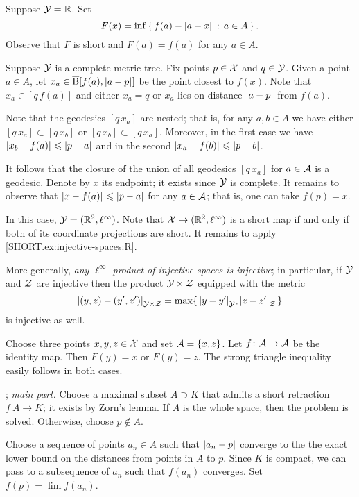 Suppose $\mathcal{Y}=\mathbb{R}$.
Set 
\[F(x)=\inf\set{f(a)-\dist{a}{x}{}}{a\in A}.\] 
Observe that $F$ is short and $F(a)=f(a)$ for any $a\in A$.

Suppose  $\mathcal{Y}$ is a complete metric tree.
Fix points $p\in \mathcal{X}$ and $q\in\mathcal{Y}$.
Given a point $a\in A$,
let $x_a\in\cBall[f(a),\dist{a}{p}{}]$ be the point closest to $f(x)$.
Note that $x_a\in[q\,f(a)]$ and either $x_a=q$ or $x_a$ lies on distance $\dist{a}{p}{}$ from $f(a)$.

Note that the geodesics $[q\,x_a]$ are nested;
that is, for any $a,b\in A$ we have either $[q\,x_a]\subset [q\,x_b]$ or $[q\,x_b]\subset [q\,x_a]$.
Moreover, in the first case we have $\dist{x_b}{f(a)}{}\le \dist{p}{a}{}$ and in the second $\dist{x_a}{f(b)}{}\le \dist{p}{b}{}$.

It follows that the closure of the union of all geodesics $[q\,x_a]$ for $a\in\mathcal{A}$ is a geodesic.
Denote by $x$ its endpoint; it exists since $\mathcal{Y}$ is complete.
It remains to observe that $\dist{x}{f(a)}{}\le \dist{p}{a}{}$ for any $a\in\mathcal{A}$;
that is, one can take $f(p)=x$.

In this case, $\mathcal{Y}=(\mathbb{R}^2,\ell^\infty)$.
Note that $\mathcal{X}\to (\mathbb{R}^2,\ell^\infty)$ is a short map if and only if both of its coordinate projections are short.
It remains to apply \ref{SHORT.ex:injective-spaces:R}.

More generally, \emph{any $\ell^\infty$-product of injective spaces is injective};
in particular, if $\mathcal{Y}$ and $\mathcal{Z}$ are injective then the product $\mathcal{Y}\times\mathcal{Z}$ equipped with the metric 
\[\dist{(y,z)}{(y',z')}{\spc{Y}\times\spc{Z}}=\max\{\,\dist{y}{y'}{\spc{Y}},\dist{z}{z'}{\spc{Z}}\,\}\]
is injective as well.


Choose three points $x,y,z\in\mathcal{X}$ and set $\mathcal{A}=\{x,z\}$.
Let $f\:\spc{A}\z\to \spc{A}$ be the identity map.
Then $F(y)=x$ or $F(y)=z$.
The strong triangle inequality easily follows in both cases.

\parbf{\ref{ex:ultrametric-converse}}; \textit{main part.}
Choose a maximal subset $A\supset K$ that admits a short retraction $f\:A\to K$;
it exists by Zorn's lemma.
If $A$ is the whole space, then the problem is solved.
Otherwise, choose $p\notin A$.

Choose a sequence of points $a_n\in A$ such that $\dist{a_n}{p}{}$ converge to the the exact lower bound on the distances from points in $A$ to $p$.
Since $K$ is compact, we can pass to a subsequence of $a_n$ such that $f(a_n)$ converges.
Set $f(p)=\lim f(a_n)$.

